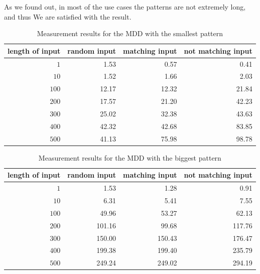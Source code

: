 		As we found out, in most of the use cases the patterns are not extremely long, and thus We are satisfied with the result.
		
		\begin{table}
			\centering
			\caption{Measurement results for the MDD with the smallest pattern}		
			\label{tab:cep:measrun:small:mdd}
			\begin{tabular}{rrrr}
				\toprule
				length of input & random input & matching input & not matching input \\ \midrule
				            $1$ &         1.53 &           0.57 &               0.41 \\
				           $10$ &         1.52 &           1.66 &               2.03 \\
				          $100$ &        12.17 &          12.32 &              21.84 \\
				          $200$ &        17.57 &          21.20 &              42.23 \\
				          $300$ &        25.02 &          32.38 &              43.63 \\
				          $400$ &        42.32 &          42.68 &              83.85 \\
				          $500$ &        41.13 &          75.98 &              98.78 \\ \bottomrule
			\end{tabular}
		\end{table}
	
		\begin{table}
			\centering
			\caption{Measurement results for the MDD with the biggest pattern}		
			\label{tab:cep:measrun:big:mdd}
			\begin{tabular}{rrrr}
				\toprule
				length of input & random input & matching input & not matching input \\ \midrule
				            $1$ &         1.53 &           1.28 &               0.91 \\
				           $10$ &         6.31 &           5.41 &               7.55 \\
				          $100$ &        49.96 &          53.27 &              62.13 \\
				          $200$ &       101.16 &          99.68 &             117.76 \\
				          $300$ &       150.00 &         150.43 &             176.47 \\
				          $400$ &       199.38 &         199.40 &             235.79 \\
				          $500$ &       249.24 &         249.02 &             294.19 \\ \bottomrule
			\end{tabular}
		\end{table}
	
